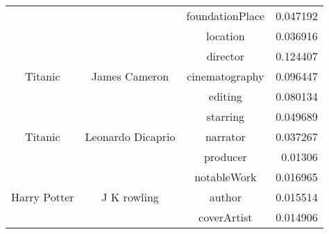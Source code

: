 \begin{table}[ht!]
\begin{tabular}{cccr}
    \multicolumn{1}{c}{} & \multicolumn{1}{c}{} & foundationPlace & 0.047192 \\
    \multicolumn{1}{c}{} & \multicolumn{1}{c}{} & location & 0.036916 \\
    \hline
    \multicolumn{1}{c}{\multirow{3}{*}{Titanic}} & \multicolumn{1}{c}{\multirow{3}[0]{*}{James Cameron}} & director & 0.124407 \\
    \multicolumn{1}{c}{} & \multicolumn{1}{c}{} & cinematography & 0.096447 \\
    \multicolumn{1}{c}{} & \multicolumn{1}{c}{} & editing & 0.080134 \\
    \hline
    \multicolumn{1}{c}{\multirow{3}{*}{Titanic}} & \multicolumn{1}{c}{\multirow{3}[0]{*}{Leonardo Dicaprio}} & starring & 0.049689 \\
    \multicolumn{1}{c}{} & \multicolumn{1}{c}{} & narrator & 0.037267 \\
    \multicolumn{1}{c}{} & \multicolumn{1}{c}{} & producer & 0.01306 \\
    \hline
    \multicolumn{1}{c}{\multirow{3}{*}{\parbox{1cm}{\centering Harry Potter}}} & \multicolumn{1}{c}{\multirow{3}[0]{*}{J K rowling}} & notableWork & 0.016965 \\
    \multicolumn{1}{c}{} & \multicolumn{1}{c}{} & author & 0.015514 \\
    \multicolumn{1}{c}{} & \multicolumn{1}{c}{} & coverArtist & 0.014906 \\
    \bottomrule
    \end{tabular}%
  \label{tab:results}%
\end{table}%


